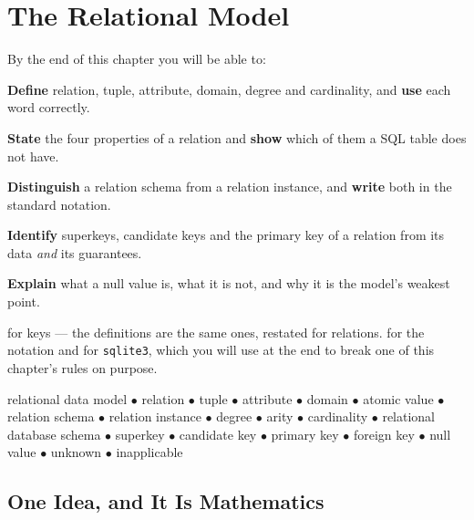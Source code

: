 \chapter{The Relational Model}\label{ch:relational}

\begin{outcomes}
By the end of this chapter you will be able to:
\begin{tight}
  \item \textbf{Define} relation, tuple, attribute, domain, degree and
        cardinality, and \textbf{use} each word correctly.
  \item \textbf{State} the four properties of a relation and \textbf{show}
        which of them a SQL table does not have.
  \item \textbf{Distinguish} a relation schema from a relation instance, and
        \textbf{write} both in the standard notation.
  \item \textbf{Identify} superkeys, candidate keys and the primary key of a
        relation from its data \emph{and} its guarantees.
  \item \textbf{Explain} what a null value is, what it is not, and why it is
        the model's weakest point.
\end{tight}
\end{outcomes}

\begin{prereq}
 for keys --- the definitions are the same ones, restated for
relations.  for the \relation{}{} notation and for
\texttt{sqlite3}, which you will use at the end to break one of this
chapter's rules on purpose.
\end{prereq}

\begin{keyterms}
relational data model $\bullet$ relation $\bullet$ tuple $\bullet$ attribute
$\bullet$ domain $\bullet$ atomic value $\bullet$ relation schema $\bullet$
relation instance $\bullet$ degree $\bullet$ arity $\bullet$ cardinality
$\bullet$ relational database schema $\bullet$ superkey $\bullet$ candidate
key $\bullet$ primary key $\bullet$ foreign key $\bullet$ null value
$\bullet$ unknown $\bullet$ inapplicable
\end{keyterms}

\section{One Idea, and It Is Mathematics}


